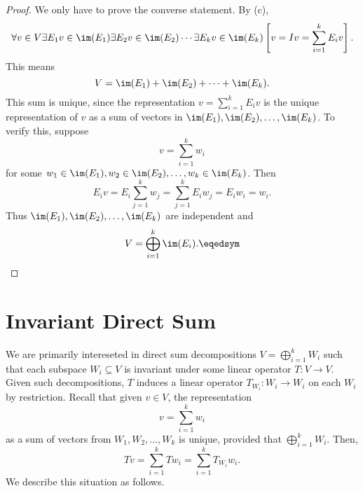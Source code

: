 \documentclass[math_245.tex]{subfiles}
\begin{document}
    \begin{proof}
        We only have to prove the converse statement. By (c),
        \begin{equation*}
            \forall v\in V\exists E_1v\in \im(E_1)\exists E_2v\in \im(E_2)\cdots\exists E_kv\in \im(E_k) \left[ v = Iv = \sum^{k}_{i=1} E_iv \right].
        \end{equation*}
        This means
        \begin{equation*}
            V = \im(E_1) + \im(E_2) + \cdots + \im(E_k).
        \end{equation*}
        This sum is unique, since the representation $v = \sum^{k}_{i=1} E_iv$ is the unique representation of $v$ as a sum of vectors in $\im(E_1), \im(E_2), \ldots, \im(E_k)$. To verify this, suppose
        \begin{equation*}
            v = \sum^{k}_{i=1} w_i
        \end{equation*}
        for some $w_1\in \im(E_1), w_2\in \im(E_2), \ldots, w_k\in \im(E_k)$. Then
        \begin{equation*}
            E_iv = E_i \sum^{k}_{j=1} w_j = \sum^{k}_{j=1} E_iw_j = E_iw_i = w_i.
        \end{equation*}
        Thus $\im(E_1), \im(E_2), \ldots, \im(E_k)$ are independent and
        \begin{equation*}
            V = \bigoplus^{k}_{i=1} \im(E_i). \eqedsym
        \end{equation*}
    \end{proof}

    \section{Invariant Direct Sum}

    \begin{remark}
        We are primarily intereseted in direct sum decompositions $V = \bigoplus^{k}_{i=1} W_i$ such that each subspace $W_i\subseteq V$ is invariant under some linear operator $T:V\to V$. Given such decompositions, $T$ induces a linear operator $T_{W_i}: W_i\to W_i$ on each $W_i$ by restriction. Recall that given $v\in V$, the representation
        \begin{equation*}
            v = \sum^{k}_{i=1} w_i
        \end{equation*}
        as a sum of vectors from $W_1, W_2, \ldots, W_k$ is unique, provided that $\bigoplus^{k}_{i=1} W_i$. Then,
        \begin{equation*}
            Tv = \sum^{k}_{i=1} Tw_i = \sum^{k}_{i=1} T_{W_i}w_i.
        \end{equation*}
        We describe this situation as follows.
    \end{remark}
\end{document}
